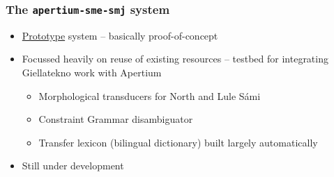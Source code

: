 \documentclass{beamer}
\begin{document}
\begin{frame}
\frametitle{The {\tt apertium-sme-smj} system}

\begin{itemize}
  \item \underline{Prototype} system -- basically proof-of-concept
  \item Focussed heavily on reuse of existing resources -- testbed for 
    integrating Giellatekno work with Apertium
  \begin{itemize}
    \item Morphological transducers for North and Lule Sámi
    \item Constraint Grammar disambiguator
    \item Transfer lexicon (bilingual dictionary) built largely automatically
  \end{itemize}
  \item Still under development
\end{itemize}

\end{frame}



\end{document}
